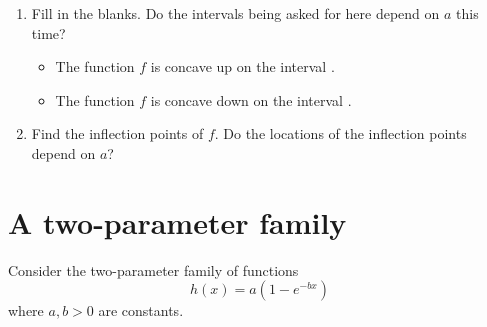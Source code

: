 \documentclass[11pt]{article}
\def\blank{\underline{\hspace{1in}}}
\begin{document}
\begin{enumerate}
	
	\item Fill in the blanks. Do the intervals being asked for here depend on $a$ this time? 
	\begin{itemize}
		\item The function $f$ is concave up on the interval \blank.
		\item The function $f$ is concave down on the interval \blank. 
	\end{itemize}
	
	\item Find the inflection points of $f$. Do the locations of the inflection points depend on $a$? 
	 
	\vspace{0.5in}
	
\end{enumerate}


\section{A two-parameter family} 
Consider the two-parameter family of functions 
\[ h(x) = a(1- e^{-bx}) \] 
where $a,b > 0$ are constants. 
\end{document}
